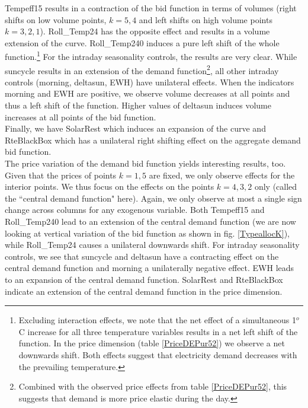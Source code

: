 Tempeff15 results in a contraction of the bid function in terms of volumes (right shifts on low volume points, $k=5,4$ and left shifts on high volume points $k=3,2,1$). Roll\_Temp24 has the opposite effect and results in a volume extension of the curve. Roll\_Temp240 induces a pure left shift of the whole function.\footnote{Excluding interaction effects, we note that the net effect of a simultaneous 1$^o$C increase for all three temperature variables results in a net left shift of the function. In the price dimension (table \ref{PriceDEPur52}) we observe a net downwards shift. Both effects suggest that electricity demand decreases with the prevailing temperature.}
For the intraday seasonality controls, the results are very clear. While suncycle results in an extension of the demand function\footnote{Combined with the observed price effects from table \ref{PriceDEPur52}, this suggests that demand is more price elastic during the day.}, all other intraday controls (morning, deltasun, EWH) have unilateral effects. When the indicators morning and EWH are positive, we observe volume decreases at all points and thus a left shift of the function. Higher values of deltasun induces volume increases at all points of the bid function.\\

Finally, we have SolarRest which induces an expansion of the curve and RteBlackBox which has a unilateral right shifting effect on the aggregate demand bid function. \\

The price variation of the demand bid function yields interesting results, too. Given that the prices of points $k=1,5$ are fixed, we only observe effects for the interior points. We thus focus on the effects on the points $k=4,3,2$ only (called the ``central demand function" here). %
Again, we only observe at most a single sign change across columns for any exogenous variable. 
Both Tempeff15 and Roll\_Temp240 lead to an extension of the central demand function (we are now looking at vertical variation of the bid function as shown in fig. \ref{TypeallocK}), while Roll\_Temp24 causes a  unilateral downwards shift. 
For intraday seasonality controls, we see that suncycle and deltasun have a contracting effect on the central demand function and morning a unilaterally negative effect. EWH leads to an expansion of the central demand function. 
SolarRest and RteBlackBox indicate an extension of the central demand function in the price dimension. \\


